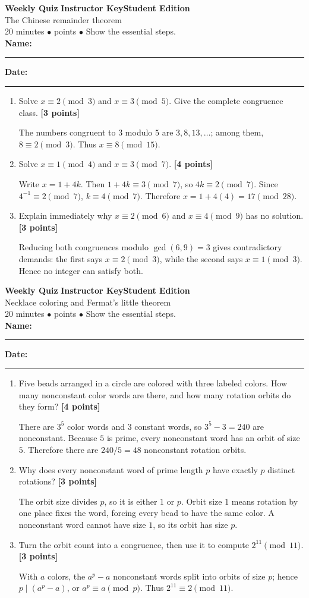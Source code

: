 \documentclass[11pt]{article}
\newcounter{quiznum}
\newcommand{\edition}{\ifanswers Instructor Key\else Student Edition\fi}
\newcommand{\points}[1]{\hfill{\small\color{coral}\textbf{[#1 points]}}}
\newcommand{\quizheading}[1]{%
  \clearpage\stepcounter{quiznum}%
  \begin{tcolorbox}[
    enhanced,colback=paper,colframe=navy,boxrule=1.1pt,arc=2mm,
    left=4mm,right=4mm,top=2.5mm,bottom=2.5mm,
    borderline west={4pt}{0pt}{teal}]
    {\Large\bfseries\color{navy}Weekly Quiz \thequiznum}\hfill
    {\bfseries\color{teal}\edition}\\[-1pt]
    {\large\color{ink}#1}\\[2pt]
    {\small\color{muted}20 minutes \quad $\bullet$ \quad 10 points \quad $\bullet$ \quad Show the essential steps.}
    \ifanswers\else
      \\[5pt]\textbf{Name:}\ \rule{0.48\linewidth}{0.4pt}\hfill
      \textbf{Date:}\ \rule{0.20\linewidth}{0.4pt}
    \fi
  \end{tcolorbox}
}
\begin{document}
\quizheading{The Chinese remainder theorem}
\begin{enumerate}
  \item Solve $x\equiv2\pmod3$ and $x\equiv3\pmod5$. Give the complete congruence
  class. \points{3}
  \begin{solution}[1.05in]
    The numbers congruent to $3$ modulo $5$ are $3,8,13,\ldots$; among them,
    $8\equiv2\pmod3$. Thus $x\equiv8\pmod{15}$.
  \end{solution}

  \item Solve $x\equiv1\pmod4$ and $x\equiv3\pmod7$. \points{4}
  \begin{solution}[1.3in]
    Write $x=1+4k$. Then $1+4k\equiv3\pmod7$, so $4k\equiv2\pmod7$.
    Since $4^{-1}\equiv2\pmod7$, $k\equiv4\pmod7$. Therefore
    $x=1+4(4)=17\pmod{28}$.
  \end{solution}

  \item Explain immediately why $x\equiv2\pmod6$ and $x\equiv4\pmod9$ has no
  solution. \points{3}
  \begin{solution}[1.2in]
    Reducing both congruences modulo $\gcd(6,9)=3$ gives contradictory demands:
    the first says $x\equiv2\pmod3$, while the second says $x\equiv1\pmod3$.
    Hence no integer can satisfy both.
  \end{solution}
\end{enumerate}

\quizheading{Necklace coloring and Fermat's little theorem}
\begin{enumerate}
  \item Five beads arranged in a circle are colored with three labeled colors.
  How many nonconstant color words are there, and how many rotation orbits do they
  form? \points{4}
  \begin{solution}[1.35in]
    There are $3^5$ color words and $3$ constant words, so $3^5-3=240$ are
    nonconstant. Because $5$ is prime, every nonconstant word has an orbit of size
    $5$. Therefore there are $240/5=48$ nonconstant rotation orbits.
  \end{solution}

  \item Why does every nonconstant word of prime length $p$ have exactly $p$
  distinct rotations? \points{3}
  \begin{solution}[1.3in]
    The orbit size divides $p$, so it is either $1$ or $p$. Orbit size $1$ means
    rotation by one place fixes the word, forcing every bead to have the same color.
    A nonconstant word cannot have size $1$, so its orbit has size $p$.
  \end{solution}

  \item Turn the orbit count into a congruence, then use it to compute
  $2^{11}\pmod{11}$. \points{3}
  \begin{solution}[1.2in]
    With $a$ colors, the $a^p-a$ nonconstant words split into orbits of size $p$;
    hence $p\mid(a^p-a)$, or $a^p\equiv a\pmod p$. Thus
    $2^{11}\equiv2\pmod{11}$.
  \end{solution}
\end{enumerate}
\end{document}
